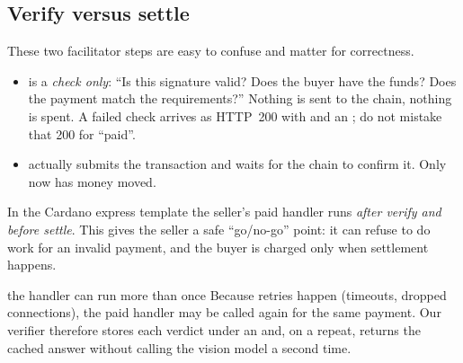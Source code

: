 \subsection{Verify versus settle}
These two facilitator steps are easy to confuse and matter for correctness.
\begin{itemize}
  \item {} is a \emph{check only}: ``Is this signature valid? Does the buyer have the funds? Does the payment match the requirements?'' Nothing is sent to the chain, nothing is spent. A failed check arrives as HTTP~200 with  and an ; do not mistake that 200 for ``paid''.
  \item {} actually submits the transaction and waits for the chain to confirm it. Only now has money moved.
\end{itemize}
In the Cardano express template the seller's paid handler runs \emph{after verify and before settle}. This gives the seller a safe ``go/no-go'' point: it can refuse to do work for an invalid payment, and the buyer is charged only when settlement happens.

\begin{center}
\end{center}

\begin{warningbox}{the handler can run more than once}
Because retries happen (timeouts, dropped connections), the paid handler may be called again for the same payment. Our verifier therefore stores each verdict under an  and, on a repeat, returns the cached answer without calling the vision model a second time.
\end{warningbox}


